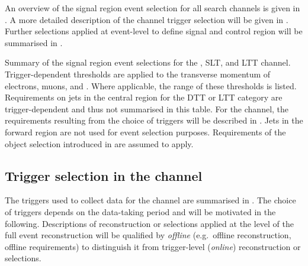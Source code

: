 An overview of the signal region event selection for all search
channels is given in . A more detailed
description of the \hadhad channel trigger selection will be given in
. Further selections applied at
event-level to define signal and control region will be summarised in
.

\begin{table}[htbp]
  \centering

  \caption{Summary of the signal region event selections for the
    \hadhad, \lephad SLT, and \lephad LTT channel. Trigger-dependent
    thresholds are applied to the transverse momentum of electrons,
    muons, and \tauhadvis. Where applicable, the range of these
    thresholds is listed.  Requirements on jets in the central region
    for the DTT or LTT category are trigger-dependent and thus not
    summarised in this table. For the \hadhad channel, the
    requirements resulting from the choice of triggers will be
    described in . Jets in the
    forward region are not used for event selection
    purposes. Requirements of the object selection introduced in
     are assumed to apply.}%
  \label{tab:event_selection}

  \resizebox{\textwidth}{!}{
    
  }
\end{table}




\subsection{Trigger selection in the \hadhad channel}%
\label{sec:trigger}%
\label{sec:hadhad_trigger_selection}

The triggers used to collect data for the \hadhad channel are
summarised in . The choice of triggers
depends on the data-taking period and will be motivated in the
following. Descriptions of reconstruction or selections applied at the
level of the full event reconstruction will be qualified by
\emph{offline} (e.g.\ offline reconstruction, offline requirements) to
distinguish it from trigger-level (\emph{online}) reconstruction or
selections.

